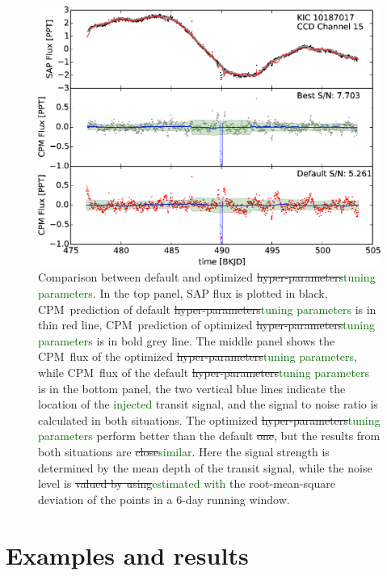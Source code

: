 \documentclass[12pt, preprint]{aastex}
\newcommand{\name}{CPM}
\newcommand{\revise}[1]{\textcolor{darkgreen}{#1}}
\newcommand{\remove}[1]{\sout{#1}}
\begin{document}
\begin{figure}[p]
\begin{center}
\includegraphics[width=\textwidth]{f3}
\end{center}
\caption{
  \label{hyperparameter}
  Comparison between default and optimized \remove{hyper-parameters}\revise{tuning parameters}. 
  In the top panel, SAP flux is plotted in black, 
    \name\ prediction of default \remove{hyper-parameters}\revise{tuning parameters} is in thin red line, 
    \name\ prediction of optimized \remove{hyper-parameters}\revise{tuning parameters} is in bold grey line. 
  The middle panel shows the \name\ flux of the optimized \remove{hyper-parameters}\revise{tuning parameters}, 
    while \name\ flux of the default \remove{hyper-parameters}\revise{tuning parameters} is in the bottom panel, 
    the two vertical blue lines indicate the location of the \revise{injected} transit signal, 
    and the signal to noise ratio is calculated in both situations. 
  The optimized \remove{hyper-parameters}\revise{tuning parameters} perform better than the default\remove{ one}, 
    but the results from both situations are \remove{close}\revise{similar}.
  Here the signal strength is determined by the mean depth of the transit signal,
    while the noise level is \remove{valued by using}\revise{estimated with} the root-mean-square deviation of the points in a 6-day running window.}
\end{figure}

\section{Examples and results}
\end{document}
